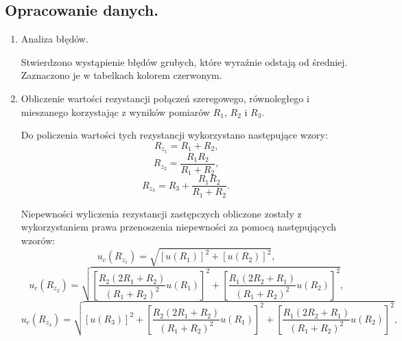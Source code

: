 \documentclass [a4paper,11pt]{article}
\begin{document}
	\subsection{Opracowanie danych.}\label{sec:drm}
	\begin{enumerate}[label=\alph*)]
		
		\item Analiza błędów.
		
		Stwierdzono wystąpienie błędów grubych, które wyraźnie odstają od średniej. Zaznaczono je w tabelkach kolorem czerwonym.
		
		\item Obliczenie wartości rezystancji połączeń szeregowego, równoległego i mieszanego korzystając z wyników pomiarów $R_1$, $R_2$ i $R_3$.
		
		Do policzenia wartości tych rezystancji wykorzystano następujące wzory: 
		\begin{equation}
		\label{eq:rz1}
		R_{z_1}=R_1 + R_2\text{,}
		\end{equation}
		\begin{equation}
		\label{eq:rz2}
		R_{z_2}=\frac{R_1 R_2}{R_1 + R_2}\text{,}
		\end{equation}
		\begin{equation}
		\label{eq:rz3}
		R_{z_3}=R_3 + \frac{R_1 R_2}{R_1 + R_2}\text{.}
		\end{equation}
		
		Niepewności wyliczenia rezystancji zastępczych obliczone zostały z wykorzystaniem prawa przenoszenia niepewności za pomocą następujących wzorów:
		\begin{equation}
		\label{eq:nrz1}
		u_c(R_{z_1})=\sqrt{\left[ u(R_1) \right]^2 + \left[ u(R_2) \right]^2}\text{,}
		\end{equation}
		\begin{equation}
		\label{eq:nrz2}
		u_c(R_{z_2})=\sqrt{\left[ \frac{R_2(2R_1+R_2)}{(R_1+R_2)^2} u(R_1) \right]^2 + \left[ \frac{R_1(2R_2+R_1)}{(R_1+R_2)^2} u(R_2) \right]^2}\text{,}
		\end{equation}
		\begin{equation}
		\label{eq:nrz3}
		u_c(R_{z_3})=\sqrt{\left[ u(R_3) \right]^2 + \left[ \frac{R_2(2R_1+R_2)}{(R_1+R_2)^2} u(R_1) \right]^2 + \left[ \frac{R_1(2R_2+R_1)}{(R_1+R_2)^2} u(R_2) \right]^2}\text{,}
		\end{equation}
		

\end{enumerate}
\end{document}
